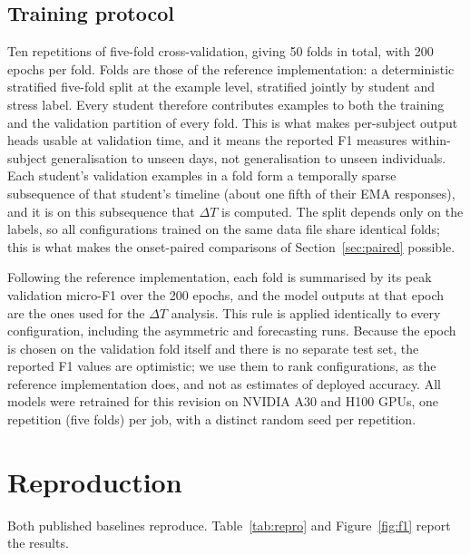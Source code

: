 \documentclass[preprint,12pt,authoryear]{elsarticle}
\newcommand{\dt}{$\Delta T$}
\begin{document}
\subsection{Training protocol}
\label{sec:protocol}

Ten repetitions of five-fold cross-validation, giving 50 folds in total,
with 200 epochs per fold. Folds are those of the reference
implementation: a deterministic stratified five-fold split at the
example level, stratified jointly by student and stress label. Every
student therefore contributes examples to both the training and the
validation partition of every fold. This is what makes per-subject
output heads usable at validation time, and it means the reported F1
measures within-subject generalisation to unseen days, not
generalisation to unseen individuals. Each student's validation
examples in a fold form a temporally sparse subsequence of that
student's timeline (about one fifth of their EMA responses), and it is
on this subsequence that \dt{} is computed. The split depends only on
the labels, so all configurations trained on the same data file share
identical folds; this is what makes the onset-paired comparisons of
Section~\ref{sec:paired} possible.

Following the reference implementation, each fold is summarised by its
peak validation micro-F1 over the 200 epochs, and the model outputs at
that epoch are the ones used for the \dt{} analysis. This rule is
applied identically to every configuration, including the asymmetric
and forecasting runs. Because the epoch is chosen on the validation
fold itself and there is no separate test set, the reported F1 values
are optimistic; we use them to rank configurations, as the reference
implementation does, and not as estimates of deployed accuracy. All models were retrained for this revision on NVIDIA A30 and H100
GPUs, one repetition (five folds) per job, with a distinct random seed
per repetition.

\section{Reproduction}
\label{sec:repro}

Both published baselines reproduce. Table~\ref{tab:repro} and
Figure~\ref{fig:f1} report the results.
\end{document}
